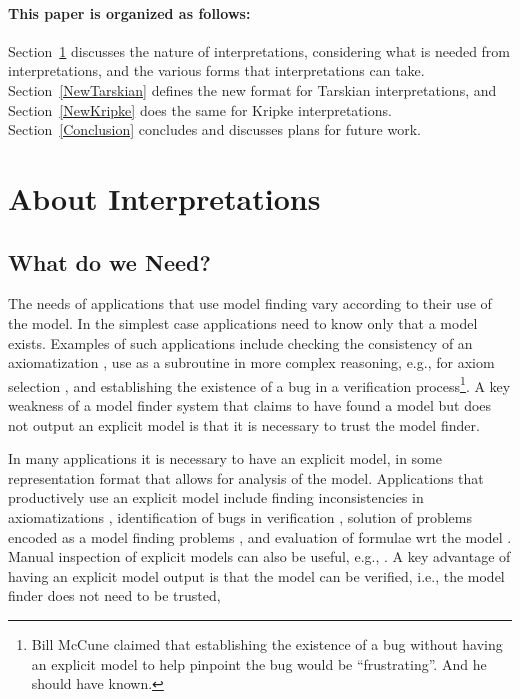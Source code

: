 \documentclass{easychair}
\begin{document}
\paragraph{This paper is organized as follows:}
Section~\ref{Interpretations} discusses the nature of interpretations, considering what is
needed from interpretations, and the various forms that interpretations can take.
Section~\ref{NewTarskian} defines the new format for Tarskian interpretations, and
Section~\ref{NewKripke} does the same for Kripke interpretations.
Section~\ref{Conclusion} concludes and discusses plans for future work.

\section{About Interpretations}
\label{Interpretations}

\subsection{What do we Need?}
\label{Need}

The needs of applications that use model finding vary according to their use of the model.
In the simplest case applications need to know only that a model exists.
Examples of such applications include checking the consistency of an axiomatization \cite{CI15},
use as a subroutine in more complex reasoning, e.g., for
axiom selection \cite{SP07,Pud07-ESARLT}, and establishing the existence of a bug in a
verification process\footnote{%
Bill McCune claimed that establishing the existence of a bug without having an explicit model
to help pinpoint the bug would be ``frustrating''. And he should have known.}.
A key weakness of a model finder system that claims to have found a model but does not output an 
explicit model is that it is necessary to trust the model finder.

In many applications it is necessary to have an explicit model, in some representation format that
allows for analysis of the model.
Applications that productively use an explicit model include finding inconsistencies in 
axiomatizations \cite{SS+17}, identification of bugs in verification \cite{CE82,QS82},
solution of problems encoded as a model finding problems \cite{Win82}, and evaluation of formulae
wrt the model \cite{SS+23-LPAR}.
Manual inspection of explicit models can also be useful, e.g., \cite{EK+10}.
A key advantage of having an explicit model output is that the model can be verified, i.e., the
model finder does not need to be trusted,
\end{document}

